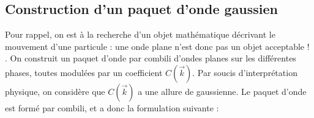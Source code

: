\documentclass[11pt]{book}
\begin{document}
\subsection{Construction d'un paquet d'onde gaussien}
Pour rappel, on est à la recherche d'un objet mathématique décrivant le mouvement d'une particule : une onde plane n'est donc pas un objet acceptable ! . On construit un paquet d'onde par combili d'ondes planes sur les différentes phases, toutes modulées par un coefficient $C(\vec{k})$. Par soucis d'interprétation physique, on considère que $C(\vec{k})$ a une allure de gaussienne. Le paquet d'onde est formé par combili, et a donc la formulation suivante :

\end{document}
